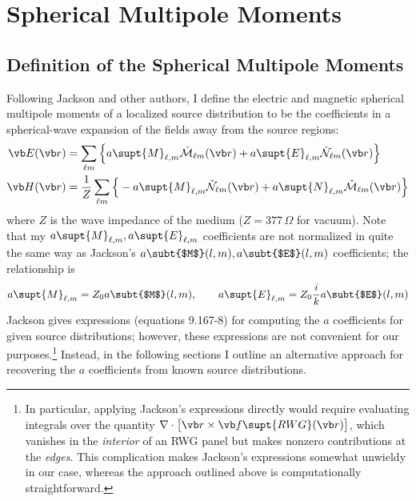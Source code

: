 \newpage
\section{Spherical Multipole Moments}

\subsection*{Definition of the Spherical Multipole Moments}

Following Jackson and other authors, I define the 
electric and magnetic spherical multipole moments of a localized source 
distribution to be the coefficients in a spherical-wave
expansion of the fields away from the source regions:
\begin{subequations}
\begin{align}
 \vb E(\vb r) &= \sum_{\ell m} \Big\{  a\supt{M}_{\ell,m} \MMExt_{\ell m}(\vb r)
                                      +a\supt{E}_{\ell,m} \NNExt_{\ell m}(\vb r)
                               \Big\}
\\
 \vb H(\vb r) &= \frac{1}{Z}
                 \sum_{\ell m} \Big\{ -a\supt{M}_{\ell,m} \NNExt_{\ell m}(\vb r)
                                      +a\supt{N}_{\ell,m} \MMExt_{\ell m}(\vb r)
                               \Big\}
\end{align}
\label{SphericalMultipoleDefinitions}
\end{subequations}
where $Z$ is the wave impedance of the medium ($Z=377\,\Omega$ for vacuum).
Note that my $a\supt{M}_{\ell,m}, a\supt{E}_{\ell,m}$ coefficients
are not normalized in quite the same way as Jackson's
$a\subt{$M$}(l,m), a\subt{$E$}(l,m)$ coefficients; 
the relationship is 
$$ a\supt{M}_{\ell,m} = Z_0 a\subt{$M$}(l,m), \qquad 
   a\supt{E}_{\ell,m} = Z_0 \frac{i}{k} a\subt{$E$}(l,m)
$$
Jackson gives expressions (equations 9.167-8) for computing 
the $a$ coefficients for given source distributions; however, 
these expressions are not convenient for our 
purposes.\footnote{In particular, applying Jackson's expressions
directly would require evaluating integrals over the quantity 
$\nabla\cdot \big[\vb r \times \vb f\supt{RWG}(\vb r)\big]$,
which vanishes in the \textit{interior} of an RWG panel but makes
nonzero contributions at the \textit{edges}. This complication
makes Jackson's expressions somewhat unwieldy in our case, 
whereas the approach outlined above is computationally 
straightforward.} Instead, in the following sections I outline
an alternative approach for recovering the $a$ coefficients
from known source distributions.

